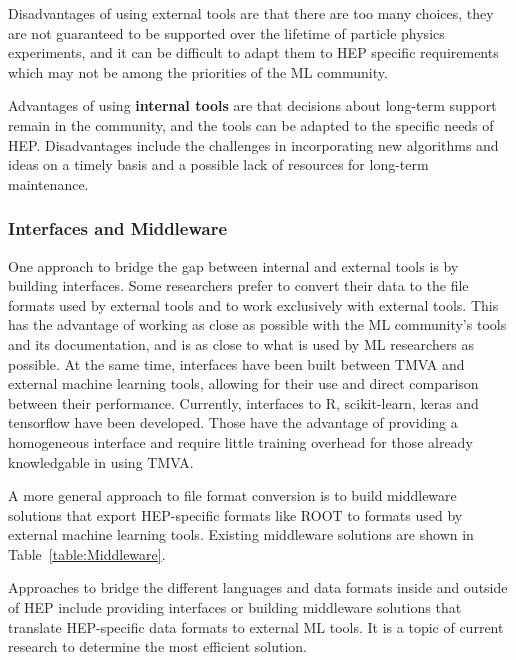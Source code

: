 Disadvantages of using external tools are that there are too many choices, they are not guaranteed to be supported over the lifetime of particle physics experiments, and it can be difficult to adapt them to HEP specific requirements which may not be among the priorities of the ML community.

Advantages of using {\bf internal tools} are that decisions about long-term support remain in the community, and the tools can be adapted to the specific needs of HEP. Disadvantages include the challenges in incorporating new algorithms and ideas on a timely basis and a possible lack of resources for long-term maintenance.

\subsubsection{Interfaces and Middleware}

One approach to bridge the gap between internal and external tools is by building interfaces. Some researchers prefer to convert their data to the file formats used by external tools and to work exclusively with external tools. This has the advantage of working as close as possible with the ML community's tools and its documentation, and is as close to what is used by ML researchers as possible.
At the same time, interfaces have been built between TMVA and external machine learning tools, allowing for their use and direct comparison between their performance. Currently, interfaces to R, scikit-learn, keras and tensorflow have been developed. Those have the advantage of providing a homogeneous interface and require little training overhead for those already knowledgable in using TMVA.

A more general approach to file format conversion is to build middleware solutions that export HEP-specific formats like ROOT to formats used by external machine learning tools.
Existing middleware solutions are shown in Table~\ref{table:Middleware}.

Approaches to bridge the different languages and data formats inside and outside of HEP include providing interfaces or building middleware solutions that translate HEP-specific data formats to external ML tools. It is a topic of current research to determine the most efficient solution.

